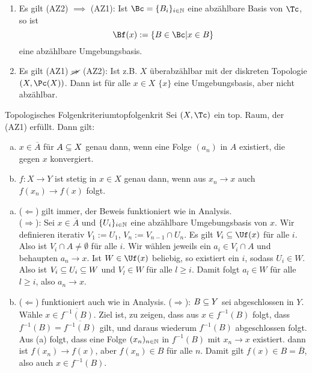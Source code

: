 \begin{bemerkungen}
\begin{enumerate}
\item Es gilt (AZ2) $\implies$ (AZ1): Ist $\Bc = \{B_i\}_{i \in \N}$ eine abzählbare Basis von $\Tc$, so ist 
\begin{equation}
\Bf (x) := \{B \in \Bc | x \in B \}
\end{equation}
eine abzählbare Umgebungsbasis.
\item Es gilt (AZ1) $\cancel{\implies}$ (AZ2): Ist z.B. $X$ überabzählbar mit der diskreten Topologie $(X, \Pc(X))$. Dann ist für alle $x \in X$ $\{x\}$ eine Umgebungsbasis, aber nicht abzählbar.
\end{enumerate}
\end{bemerkungen}
\begin{satz}{Topologisches Folgenkriterium}{topfolgenkrit}
Sei $(X, \Tc)$ ein top. Raum, der (AZ1) erfüllt. Dann gilt:
\begin{enumerate}[(a)]
\item $x \in \overline{A}$ für $A \subseteq X$ genau dann, wenn eine Folge $(a_n)$ in $A$ existiert, die gegen $x$ konvergiert.
\item $f: X \to Y$ ist stetig in $x \in X$ genau dann, wenn aus $x_n \to x$ auch $f(x_n) \to f(x)$ folgt.
\end{enumerate}
\end{satz}
\begin{beweis}
\begin{enumerate}[(a)]
\item ($\Leftarrow$) gilt immer, der Beweis funktioniert wie in Analysis.\\
($\Rightarrow$): Sei $x \in \overline{A}$ und $\{U_i\}_{i \in \mathbb{N}}$ eine abzählbare Umgebungsbasis von $x$. Wir definieren iterativ $V_1 := U_1$, $V_n := V_{n-1} \cap U_n$. Es gilt $V_i \sub \Uf (x)$ für alle $i$. Also ist $V_i \cap A \neq \emptyset$ für alle $i$. Wir wählen jeweils ein $a_i \in V_i \cap A$ und behaupten $a_n \to x$. Ist $W \in \Uf (x)$ beliebig, so existiert ein $i$, sodass $U_i \in W$. Also ist $V_i \subseteq U_i \subseteq W$ und $V_l \in W$ für alle $l \geq i$. Damit folgt $a_l \in W$ für alle $l \geq i$, also $a_n \to x$.
\item ($\Leftarrow$) funktioniert auch wie in Analysis.
($\Rightarrow$): $B \subseteq Y$ sei abgeschlossen in $Y$. Wähle $x \in \overline{f^{-1}(B)}$. Ziel ist, zu zeigen, dass aus $x \in f^{-1}(B)$ folgt, dass $f^{-1}(B) = \overline{f^{-1}(B)}$ gilt, und daraus wiederum $f^{-1}(B)$ abgeschlossen folgt.\\
Aus (a) folgt, dass eine Folge $(x_n)_{n \in \mathbb{N}}$ in $f^{-1}(B)$ mit $x_n \to x$ existiert. dann ist $f(x_n) \to f(x)$, aber $f(x_n) \in B$ für alle $n$. Damit gilt $f(x) \in B = \overline{B}$, also auch $x \in f^{-1}(B)$.
\end{enumerate}
\end{beweis}
